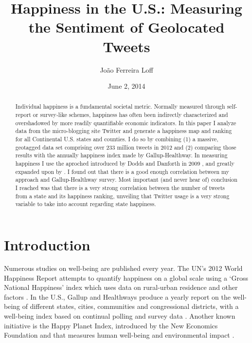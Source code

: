 \documentclass{llncs}
\begin{document}
\title{Happiness in the U.S.: Measuring the Sentiment of Geolocated Tweets}

\author{João Ferreira Loff \newline {}}
\date{June 2, 2014}

\maketitle

\begin{abstract}
Individual happiness is a fundamental societal metric. Normally measured through self-report or survey-like schemes, happiness has often been indirectly characterized and overshadowed by more readily quantifiable economic indicators. In this paper I analyze data from the micro-blogging site Twitter and generate a happiness map and ranking for all Continental U.S. states and counties. I do so by combining (1) a massive, geotagged data set comprising over 233 million tweets in 2012 and (2) comparing those results with the annually happiness index made by Gallup-Healthway. In measuring happiness I use the aproched introduced by Dodds and Danforth in 2009 \cite{Dodds2009}, and greatly expanded upon by \cite{Dodds2011,Mitchell2013}. I found out that there is a good enough correlation between my approach and Gallup-Healthway survey. Most important (and never hear of) conclusion I reached was that there is a very strong correlation between the number of tweets from a state and its happiness ranking, unveiling that Twitter usage is a very strong variable to take into account regarding state happiness.
\end{abstract}


\section{Introduction}

Numerous studies on well-being are published every year. The UN’s 2012 World Happiness Report attempts to quantify happiness on a global scale using a `Gross National Happiness' index which uses data on rural-urban residence and other factors \cite{Layard2013}. In the U.S., Gallup and Healthways produce a yearly report on the well-being of different states, cities, communities and congressional districts, with a well-being index based on continual polling and survey data \cite{GallupHealthway2013}. Another known initiative is the Happy Planet Index, introduced by the New Economics Foundation and that measures human well-being and environmental impact \cite{TheNewEconomicsFoundation2012}.
\end{document}
